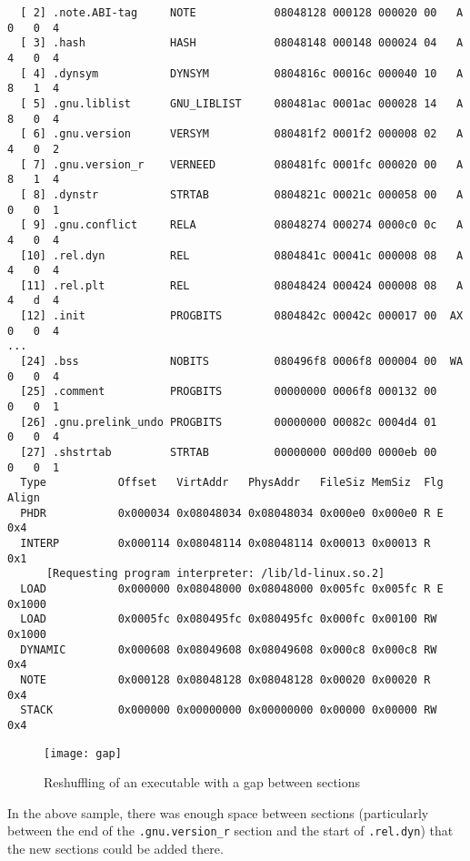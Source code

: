 \documentclass[twoside]{article}
\def\tts#1{\texttt{\small #1}}
\begin{document}
{{\begin{verbatim}
  [ 2] .note.ABI-tag     NOTE            08048128 000128 000020 00   A  0   0  4
  [ 3] .hash             HASH            08048148 000148 000024 04   A  4   0  4
  [ 4] .dynsym           DYNSYM          0804816c 00016c 000040 10   A  8   1  4
  [ 5] .gnu.liblist      GNU_LIBLIST     080481ac 0001ac 000028 14   A  8   0  4
  [ 6] .gnu.version      VERSYM          080481f2 0001f2 000008 02   A  4   0  2
  [ 7] .gnu.version_r    VERNEED         080481fc 0001fc 000020 00   A  8   1  4
  [ 8] .dynstr           STRTAB          0804821c 00021c 000058 00   A  0   0  1
  [ 9] .gnu.conflict     RELA            08048274 000274 0000c0 0c   A  4   0  4
  [10] .rel.dyn          REL             0804841c 00041c 000008 08   A  4   0  4
  [11] .rel.plt          REL             08048424 000424 000008 08   A  4   d  4
  [12] .init             PROGBITS        0804842c 00042c 000017 00  AX  0   0  4
...
  [24] .bss              NOBITS          080496f8 0006f8 000004 00  WA  0   0  4
  [25] .comment          PROGBITS        00000000 0006f8 000132 00      0   0  1
  [26] .gnu.prelink_undo PROGBITS        00000000 00082c 0004d4 01      0   0  4
  [27] .shstrtab         STRTAB          00000000 000d00 0000eb 00      0   0  1
  Type           Offset   VirtAddr   PhysAddr   FileSiz MemSiz  Flg Align
  PHDR           0x000034 0x08048034 0x08048034 0x000e0 0x000e0 R E 0x4
  INTERP         0x000114 0x08048114 0x08048114 0x00013 0x00013 R   0x1
      [Requesting program interpreter: /lib/ld-linux.so.2]
  LOAD           0x000000 0x08048000 0x08048000 0x005fc 0x005fc R E 0x1000
  LOAD           0x0005fc 0x080495fc 0x080495fc 0x000fc 0x00100 RW  0x1000
  DYNAMIC        0x000608 0x08049608 0x08049608 0x000c8 0x000c8 RW  0x4
  NOTE           0x000128 0x08048128 0x08048128 0x00020 0x00020 R   0x4
  STACK          0x000000 0x00000000 0x00000000 0x00000 0x00000 RW  0x4
\end{verbatim}}
}

\begin{figure}[!ht]
\centering
\texttt{[image: gap]}
\caption{Reshuffling of an executable with a gap between sections}
\end{figure}

In the above sample, there was enough space between sections (particularly
between the end of the \tts{.gnu.version\_r} section and the start of \tts{.rel.dyn})
that the new sections could be added there.
\end{document}
